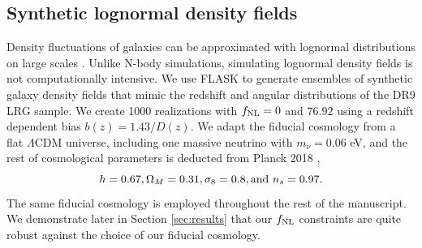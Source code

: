 \subsection{Synthetic lognormal density fields}\label{ssec:mocks}
Density fluctuations of galaxies can be approximated with lognormal distributions on large scales \citep{coles1991}. Unlike N-body simulations, simulating lognormal density fields is not computationally intensive. We use \textsc{FLASK} \citep[Full-sky Lognormal Astro-fields Simulation Kit;][]{Xavier_2016} to generate ensembles of synthetic galaxy density fields that mimic the redshift and angular distributions of the DR9 LRG sample. We create 1000 realizations with $f_{\rm NL}=0$ and $76.92$ using a redshift dependent bias $b(z)=1.43/D(z)$. We adapt the fiducial cosmology from a flat $\Lambda$CDM universe, including one massive neutrino with $m_{\nu}=0.06$ eV, and the rest of cosmological parameters is deducted from Planck 2018 \citep{aghanim2020planck},
\begin{equation*}
 h = 0.67, \Omega_{M}=0.31, \sigma_{8}=0.8, {\rm and}~ n_{s}=0.97.
\end{equation*}
The same fiducial cosmology is employed throughout the rest of the manuscript. We demonstrate later in Section \ref{sec:results} that our $f_{\rm NL}$ constraints are quite robust against the choice of our fiducial cosmology.